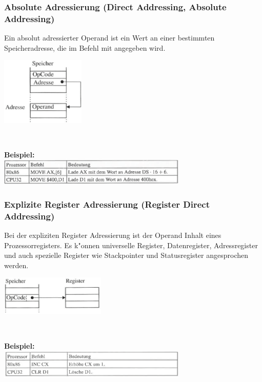 \subsubsection{Absolute Adressierung (Direct Addressing, Absolute Addressing)}
Ein absolut adressierter Operand ist ein Wert an einer bestimmten Speicheradresse, die im Befehl mit angegeben wird.
\begin{minipage}{4cm}
	\includegraphics[width=4cm]{pics/Absolute-Adressierung}
\end{minipage}
%
\begin{minipage}{0.5cm}
	\ \
\end{minipage}
%
\begin{minipage}{9cm}
	\textbf{Beispiel:}\\
	\includegraphics[width=9cm]{pics/Absolute-Adressierung-Bsp}
\end{minipage}

\subsubsection{Explizite Register Adressierung (Register Direct Addressing)}
Bei der expliziten Register Adressierung ist der Operand Inhalt eines Prozessorregisters. Es k"onnen universelle Register, Datenregister, Adressregister und auch spezielle Register wie Stackpointer und Statusregister angesprochen werden.
\begin{minipage}{5cm}
	\includegraphics[width=5cm]{pics/Explizite-Adressierung}
\end{minipage}
%
\begin{minipage}{0.5cm}
	\ \
\end{minipage}
%
\begin{minipage}{9cm}
	\textbf{Beispiel:}\\
	\includegraphics[width=9cm]{pics/Explizite-Adressierung-Bsp}
\end{minipage}

